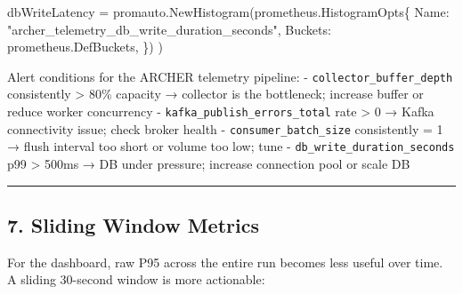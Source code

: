 \documentclass[
]{article}
\newenvironment{Shaded}{}{}
\newcommand{\NormalTok}[1]{#1}
\newcommand{\OperatorTok}[1]{\textcolor[rgb]{0.40,0.40,0.40}{#1}}
\newcommand{\StringTok}[1]{\textcolor[rgb]{0.25,0.44,0.63}{#1}}
\begin{document}
\begin{Shaded}
\begin{Highlighting}[]
\NormalTok{    dbWriteLatency }\OperatorTok{=}\NormalTok{ promauto}\OperatorTok{.}\NormalTok{NewHistogram}\OperatorTok{(}\NormalTok{prometheus}\OperatorTok{.}\NormalTok{HistogramOpts}\OperatorTok{\{}
\NormalTok{        Name}\OperatorTok{:}    \StringTok{"archer\_telemetry\_db\_write\_duration\_seconds"}\OperatorTok{,}
\NormalTok{        Buckets}\OperatorTok{:}\NormalTok{ prometheus}\OperatorTok{.}\NormalTok{DefBuckets}\OperatorTok{,}
    \OperatorTok{\})}
\OperatorTok{)}
\end{Highlighting}
\end{Shaded}

Alert conditions for the ARCHER telemetry pipeline: -
\texttt{collector\_buffer\_depth} consistently \textgreater{} 80\%
capacity → collector is the bottleneck; increase buffer or reduce worker
concurrency - \texttt{kafka\_publish\_errors\_total} rate \textgreater{}
0 → Kafka connectivity issue; check broker health -
\texttt{consumer\_batch\_size} consistently = 1 → flush interval too
short or volume too low; tune - \texttt{db\_write\_duration\_seconds}
p99 \textgreater{} 500ms → DB under pressure; increase connection pool
or scale DB

\begin{center}\rule{0.5\linewidth}{0.5pt}\end{center}

\hypertarget{sliding-window-metrics}{%
\subsection{7. Sliding Window Metrics}\label{sliding-window-metrics}}

For the dashboard, raw P95 across the entire run becomes less useful
over time. A sliding 30-second window is more actionable:
\end{document}
